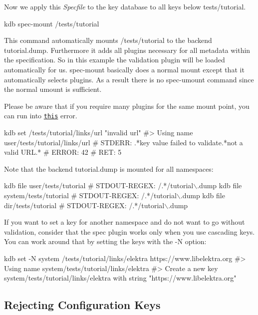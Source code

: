 Now we apply this {\itshape Specfile} to the key database to all keys below {\ttfamily tests/tutorial}. 
\begin{DoxyCode}
kdb spec-mount /tests/tutorial
\end{DoxyCode}
 This command automatically mounts {\ttfamily /tests/tutorial} to the backend {\ttfamily tutorial.\+dump}. Furthermore it adds all plugins necessary for all metadata within the specification. So in this example the validation plugin will be loaded automatically for us. {\ttfamily spec-\/mount} basically does a normal mount except that it automatically selects plugins. As a result there is no {\ttfamily spec-\/umount} command since the normal {\ttfamily umount} is sufficient.

Please be aware that if you require many plugins for the same mount point, you can run into \href{https://github.com/ElektraInitiative/libelektra/issues/2133}{\tt this} error.


\begin{DoxyCode}
kdb set /tests/tutorial/links/url "invalid url"
#> Using name user/tests/tutorial/links/url
# STDERR: .*key value failed to validate.*not a valid URL.*
# ERROR:  42
# RET:    5
\end{DoxyCode}


Note that the backend {\ttfamily tutorial.\+dump} is mounted for all namespaces\+: 
\begin{DoxyCode}
kdb file user/tests/tutorial
# STDOUT-REGEX: /.*/tutorial\(\backslash\).dump
kdb file system/tests/tutorial
# STDOUT-REGEX: /.*/tutorial\(\backslash\).dump
kdb file dir/tests/tutorial
# STDOUT-REGEX: /.*/tutorial\(\backslash\).dump
\end{DoxyCode}


If you want to set a key for another namespace and do not want to go without validation, consider that the spec plugin works only when you use cascading keys. You can work around that by setting the keys with the {\ttfamily -\/N} option\+: 
\begin{DoxyCode}
kdb set -N system /tests/tutorial/links/elektra https://www.libelektra.org
#> Using name system/tests/tutorial/links/elektra
#> Create a new key system/tests/tutorial/links/elektra with string "https://www.libelektra.org"
\end{DoxyCode}


\subsection*{Rejecting Configuration Keys}

